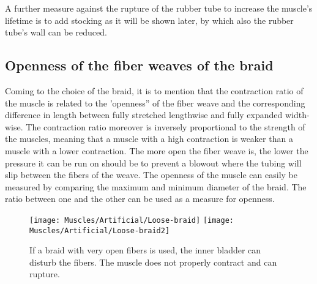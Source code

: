 \documentclass[main]{subfiles}
\begin{document}
A further measure against the rupture of the rubber tube to increase the muscle's lifetime is to add stocking as it will be shown later, by which also the rubber tube's wall can be reduced.

\subsection{Openness of the fiber weaves of the braid}

Coming to the choice of the braid, it is to mention that the contraction ratio of the muscle is related to the 'openness'' of the fiber weave and the corresponding difference in length between fully stretched lengthwise and fully expanded width-wise. The contraction ratio moreover is inversely proportional to the strength of the muscles, meaning that a muscle with a high contraction is weaker than a muscle with a lower contraction. The more open the fiber weave is, the lower the pressure it can be run on should be to prevent a blowout where the tubing will slip between the fibers of the weave. The openness of the muscle can easily be measured by comparing the maximum and minimum diameter of the braid. The ratio between one and the other can be used as a measure for openness.

\begin{figure}[htp]
\centering
\texttt{[image: Muscles/Artificial/Loose-braid]}
\texttt{[image: Muscles/Artificial/Loose-braid2]}
\caption[Open fiber braid]{If a braid with very open fibers is used, the inner bladder can disturb the fibers. The muscle does not properly contract and can rupture.}
\label{loose-braid}
\end{figure}

\end{document}

